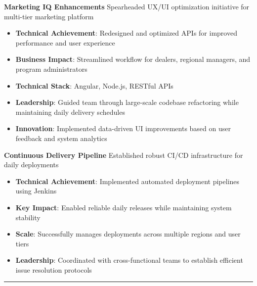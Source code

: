 \documentclass[letterpaper,10pt]{article}
\newcommand{\texthr}[1]{%
	\begin{center}
	\rule{2cm}{0.4pt}
	\end{center}
}
\begin{document}
\vspace{0.4em}\noindent\large\textbf{Marketing IQ Enhancements}\newline
\noindent Spearheaded UX/UI optimization initiative for multi-tier marketing platform
\begin{itemize}[leftmargin=*, nosep, itemsep=0.4em, before=\vspace{0.6em}, after=\vspace{0.8em}, label={}]
	\item \textbf{Technical Achievement}: Redesigned and optimized APIs for improved performance and user experience
	\item \textbf{Business Impact}: Streamlined workflow for dealers, regional managers, and program administrators
	\item \textbf{Technical Stack}: Angular, Node.js, RESTful APIs
	\item \textbf{Leadership}: Guided team through large-scale codebase refactoring while maintaining daily delivery schedules
	\item \textbf{Innovation}: Implemented data-driven UI improvements based on user feedback and system analytics
\end{itemize}

\vspace{0.4em}\noindent\large\textbf{Continuous Delivery Pipeline}\newline
\noindent Established robust CI/CD infrastructure for daily deployments
\begin{itemize}[leftmargin=*, nosep, itemsep=0.4em, before=\vspace{0.6em}, after=\vspace{0.8em}, label={}]
	\item \textbf{Technical Achievement}: Implemented automated deployment pipelines using Jenkins
	\item \textbf{Key Impact}: Enabled reliable daily releases while maintaining system stability
	\item \textbf{Scale}: Successfully manages deployments across multiple regions and user tiers
	\item \textbf{Leadership}: Coordinated with cross-functional teams to establish efficient issue resolution protocols
\end{itemize}

\texthr{}
\end{document}
